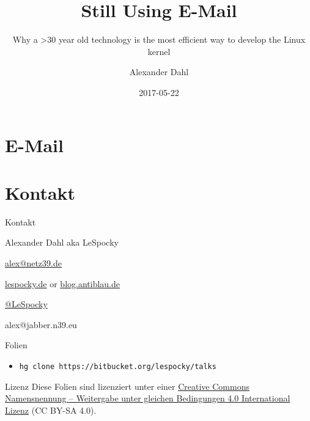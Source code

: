 \documentclass{beamer}
\title{Still Using E-Mail}
\subtitle{Why a >30 year old technology is the most efficient way to develop the Linux kernel}
\author{Alexander Dahl}
\institute[lespocky.de]{\url{http://www.lespocky.de/}}
\date{2017-05-22}
\begin{document}
\begin{frame}
	\titlepage
\end{frame}

%    

\section{E-Mail}


\section{Kontakt}

\begin{frame}{Kontakt}
    \begin{block}{Alexander Dahl aka LeSpocky}
        \begin{description}[Twitter]
            \item [E-Mail] \href{mailto:alex@netz39.de}{alex@netz39.de}
            \item [WWW] \href{http://www.lespocky.de/}{lespocky.de} or
                    \href{http://blog.antiblau.de/}{blog.antiblau.de}
            \item [Twitter] \href{https://twitter.com/LeSpocky}{@LeSpocky}
            \item [XMPP] alex@jabber.n39.eu
        \end{description}
    \end{block}
    \begin{block}{Folien}
        \begin{itemize}
            \item \texttt{hg clone https://bitbucket.org/lespocky/talks}
        \end{itemize}
    \end{block}
    \begin{block}{Lizenz}
        Diese Folien sind lizenziert unter einer
        \href{http://creativecommons.org/licenses/by-sa/4.0/}{Creative Commons \\
        Namensnennung -- Weitergabe unter gleichen Bedingungen 4.0
        International Lizenz} (CC BY-SA 4.0).
    \end{block}
\end{frame}
\end{document}
